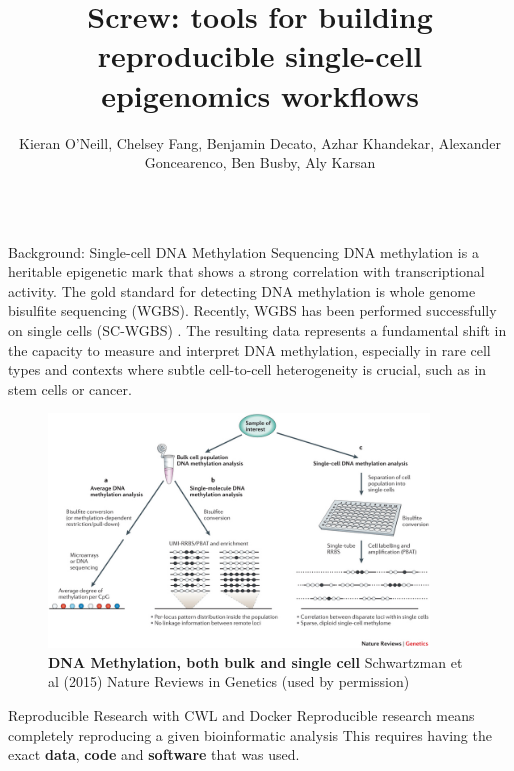 \documentclass{beamer}
\title{Screw: tools for building reproducible single-cell epigenomics workflows}
\author{Kieran O'Neill, Chelsey Fang, Benjamin Decato, Azhar Khandekar, Alexander Goncearenco, Ben Busby, Aly Karsan}
\institute{Genome Sciences Centre, BC Cancer Agency, Vancouver, BC, Canada}
\begin{document}
\begin{frame}
\begin{columns}[t]



\begin{column}{.32\textwidth}


\begin{block}{Background: Single-cell DNA Methylation Sequencing}
DNA methylation is a heritable epigenetic mark that shows a strong correlation with transcriptional activity. 
The gold standard for detecting DNA methylation is whole genome bisulfite sequencing (WGBS). 
Recently, WGBS has been performed successfully on single cells (SC-WGBS) \cite{Schwartzman2015}.
The resulting data represents a fundamental shift in the capacity to measure and interpret DNA methylation, especially in rare cell types and contexts where subtle cell-to-cell heterogeneity is crucial, such as in stem cells or cancer. 

\begin{figure}
\begin{center}
\includegraphics[width=0.9\textwidth]{figures/nrg3980-f1.jpg}
\end{center}
\caption[]{\textbf{DNA Methylation, both bulk and single cell}
Schwartzman et al (2015) Nature Reviews in Genetics (used by permission) }
\end{figure}

\end{block}


\begin{block}{Reproducible Research with CWL and Docker}
Reproducible research means completely reproducing a given bioinformatic analysis
This requires having the exact \textbf{data}, \textbf{code} and \textbf{software} that was used.


\end{block}
\end{column}
\end{columns}
\end{frame}
\end{document}
